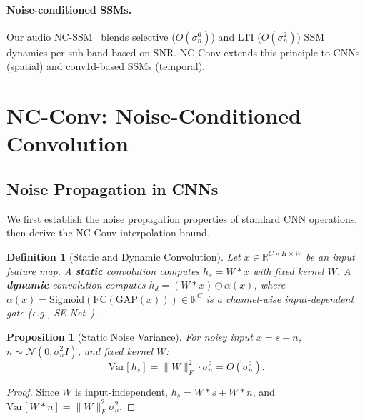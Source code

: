 \documentclass[10pt,twocolumn,letterpaper]{article}
\newtheorem{proposition}{Proposition}
\newtheorem{definition}{Definition}
\begin{document}
\paragraph{Noise-conditioned SSMs.}
Our audio NC-SSM~\cite{choi2026ncssm} blends selective ($O(\sigma_n^6)$) and LTI ($O(\sigma_n^2)$) SSM dynamics per sub-band based on SNR.
NC-Conv extends this principle to CNNs (spatial) and conv1d-based SSMs (temporal).


\section{NC-Conv: Noise-Conditioned Convolution}
\label{sec:method}

\subsection{Noise Propagation in CNNs}
\label{sec:theory}

We first establish the noise propagation properties of standard CNN operations, then derive the NC-Conv interpolation bound.

\begin{definition}[Static and Dynamic Convolution]
Let $x \in \mathbb{R}^{C \times H \times W}$ be an input feature map.
A \textbf{static} convolution computes $h_s = W * x$ with fixed kernel $W$.
A \textbf{dynamic} convolution computes $h_d = (W * x) \odot \alpha(x)$, where $\alpha(x) = \text{Sigmoid}(\text{FC}(\text{GAP}(x))) \in \mathbb{R}^C$ is a channel-wise input-dependent gate (e.g., SE-Net~\cite{hu2018squeeze}).
\end{definition}

\begin{proposition}[Static Noise Variance]
\label{prop:static}
For noisy input $x = s + n$, $n \sim \mathcal{N}(0, \sigma_n^2 I)$, and fixed kernel $W$:
\begin{equation}
\text{Var}[h_s] = \|W\|_F^2 \cdot \sigma_n^2 = O(\sigma_n^2).
\end{equation}
\end{proposition}
\begin{proof}
Since $W$ is input-independent, $h_s = W * s + W * n$, and $\text{Var}[W * n] = \|W\|_F^2 \sigma_n^2$.
\end{proof}
\end{document}
